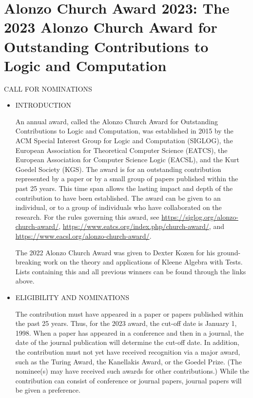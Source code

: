 \documentclass[prodmode,acmtecs]{acmsmall} %
\begin{document}
\section{Alonzo Church Award 2023: The 2023 Alonzo Church Award for Outstanding Contributions to Logic and Computation}\label{AlonzoChurchAward2023}CALL FOR NOMINATIONS 

\begin{itemize}\item  INTRODUCTION 
 
  An annual award, called the Alonzo Church Award for Outstanding Contributions to Logic and Computation, was established in 2015 by the ACM Special Interest Group for Logic and Computation (SIGLOG), the European Association for Theoretical Computer Science (EATCS), the European Association for Computer Science Logic (EACSL), and the Kurt Goedel Society (KGS). The award is for an outstanding contribution represented by a paper or by a small group of papers published within the past 25 years. This time span allows the lasting impact and depth of the contribution to have been established. The award can be given to an individual, or to a group of individuals who have collaborated on the research. For the rules governing this award, see \href{https://siglog.org/alonzo-church-award/}{https://siglog.org/alonzo-church-award/}, \href{https://www.eatcs.org/index.php/church-award/}{https://www.eatcs.org/index.php/church-award/}, and \href{https://www.eacsl.org/alonzo-church-award/}{https://www.eacsl.org/alonzo-church-award/}. 
 
  The 2022 Alonzo Church Award was given to Dexter Kozen for his ground- breaking work on the theory and applications of Kleene Algebra with Tests. Lists containing this and all previous winners can be found through the links above.  
 
\item  ELIGIBILITY AND NOMINATIONS 
 
  The contribution must have appeared in a paper or papers published within the past 25 years. Thus, for the 2023 award, the cut-off date is January 1, 1998. When a paper has appeared in a conference and then in a journal, the date of the journal publication will determine the cut-off date. In addition, the contribution must not yet have received recognition via a major award, such as the Turing Award, the Kanellakis Award, or the Goedel Prize. (The nominee(s) may have received such awards for other contributions.) While the contribution can consist of conference or journal papers, journal papers will be given a preference. 
 

\end{itemize}
\end{document}
